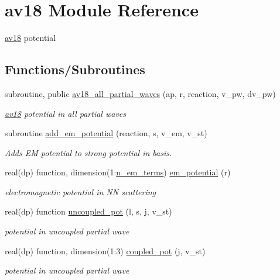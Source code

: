 \hypertarget{namespaceav18}{}\section{av18 Module Reference}
\label{namespaceav18}


\hyperlink{namespaceav18}{av18} potential  


\subsection*{Functions/\+Subroutines}
\begin{DoxyCompactItemize}
\item 
subroutine, public \hyperlink{namespaceav18_aa3a8f4d6382c199fcc71197445711d3d}{av18\+\_\+all\+\_\+partial\+\_\+waves} (ap, r, reaction, v\+\_\+pw, dv\+\_\+pw)
\begin{DoxyCompactList}\small\item\em \hyperlink{namespaceav18}{av18} potential in all partial waves \end{DoxyCompactList}\item 
subroutine \hyperlink{namespaceav18_ac263bd481e6a61fd5eaae23d97dce143}{add\+\_\+em\+\_\+potential} (reaction, s, v\+\_\+em, v\+\_\+st)
\begin{DoxyCompactList}\small\item\em Adds EM potential to strong potential in basis. \end{DoxyCompactList}\item 
real(dp) function, dimension(1\+:\hyperlink{namespaceav18_abdf1bd7208851f82a6773c558de0602f}{n\+\_\+em\+\_\+terms}) \hyperlink{namespaceav18_af5419f35a68d9a2059fce4f02afd9af4}{em\+\_\+potential} (r)
\begin{DoxyCompactList}\small\item\em electromagnetic potential in NN scattering \end{DoxyCompactList}\item 
real(dp) function \hyperlink{namespaceav18_a9d2b56f5ea01d81ae52e60b023551d9e}{uncoupled\+\_\+pot} (l, s, j, v\+\_\+st)
\begin{DoxyCompactList}\small\item\em potential in uncoupled partial wave \end{DoxyCompactList}\item 
real(dp) function, dimension(1\+:3) \hyperlink{namespaceav18_a440cc1c708d1c17c19cad4ab67a6c289}{coupled\+\_\+pot} (j, v\+\_\+st)
\begin{DoxyCompactList}\small\item\em potential in uncoupled partial wave \end{DoxyCompactList}\item 

\end{DoxyCompactItemize}
